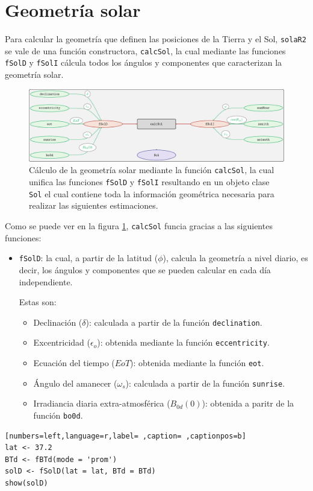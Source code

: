 \section{Geometría solar}
\label{sec:orga4f15b1}
\label{sec:geometria-solar}
Para calcular la geometría que definen las posiciones de la Tierra y el Sol, \texttt{solaR2} se vale de una función constructora, \texttt{calcSol}, la cual mediante las funciones \texttt{fSolD} y \texttt{fSolI} cálcula todos los ángulos y componentes que caracterizan la geometría solar.
\begin{figure}[htbp]
\centering
\includegraphics[keepaspectratio,width=\textwidth,height=0.5\textheight]{figuras/calcSol.pdf}
\caption{Cálculo de la geometría solar mediante la función \texttt{calcSol}, la cual unifica las funciones \texttt{fSolD} y \texttt{fSolI} resultando en un objeto clase \texttt{Sol} el cual contiene toda la información geométrica necesaria para realizar las siguientes estimaciones. \label{fig:calcSol}}
\end{figure}

Como se puede ver en la figura \ref{fig:calcSol}, \texttt{calcSol} funcia gracias a las siguientes funciones:
\begin{itemize}
\item \texttt{fSolD}: la cual, a partir de la latitud (\(\phi\)), calcula la geometría a nivel diario, es decir, los ángulos y componentes que se pueden calcular en cada día independiente.

Estas son:
\begin{itemize}
\item Declinación (\(\delta\)): calculada a partir de la función \texttt{declination}.
\item Excentricidad (\(\epsilon_o\)): obtenida mediante la función \texttt{eccentricity}.
\item Ecuación del tiempo (\(EoT\)): obtenida mediante la función \texttt{eot}.
\item Ángulo del amanecer (\(\omega_s\)): calculada a partir de la función \texttt{sunrise}.
\item Irradiancia diaria extra-atmosférica (\(B_{0d}(0)\)): obtenida a paritr de la función \texttt{bo0d}.
\end{itemize}
\end{itemize}
\begin{lstlisting}[numbers=left,language=r,label= ,caption= ,captionpos=b]
lat <- 37.2
BTd <- fBTd(mode = 'prom')
solD <- fSolD(lat = lat, BTd = BTd)
show(solD)
\end{lstlisting}

